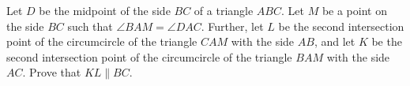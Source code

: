 Let $D$ be the midpoint of the side $BC$ of a triangle $ABC$. Let $M$ be a point on the side $BC$ such that $\angle BAM = \angle DAC$. Further, let $L$ be the second intersection point of the circumcircle of the triangle $CAM$ with the side $AB$,  and let $K$ be the second intersection point of the circumcircle of the triangle $BAM$ with the side $AC$. Prove that $KL \parallel BC$.